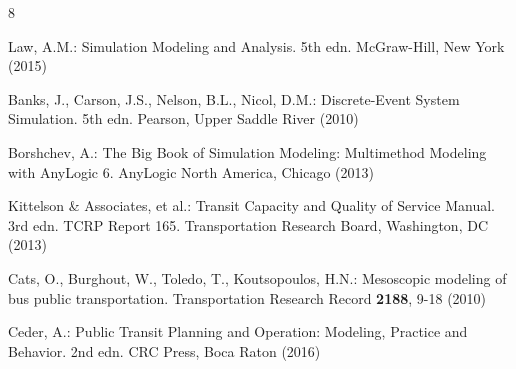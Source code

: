 \documentclass[runningheads]{llncs}
\begin{document}
\begin{thebibliography}{8}

Law, A.M.: Simulation Modeling and Analysis. 5th edn. McGraw-Hill, New York (2015)

Banks, J., Carson, J.S., Nelson, B.L., Nicol, D.M.: Discrete-Event System Simulation. 5th edn. Pearson, Upper Saddle River (2010)

Borshchev, A.: The Big Book of Simulation Modeling: Multimethod Modeling with AnyLogic 6. AnyLogic North America, Chicago (2013)

Kittelson \& Associates, et al.: Transit Capacity and Quality of Service Manual. 3rd edn. TCRP Report 165. Transportation Research Board, Washington, DC (2013)

Cats, O., Burghout, W., Toledo, T., Koutsopoulos, H.N.: Mesoscopic modeling of bus public transportation. Transportation Research Record \textbf{2188}, 9-18 (2010)

Ceder, A.: Public Transit Planning and Operation: Modeling, Practice and Behavior. 2nd edn. CRC Press, Boca Raton (2016)

\end{thebibliography}
\end{document}
